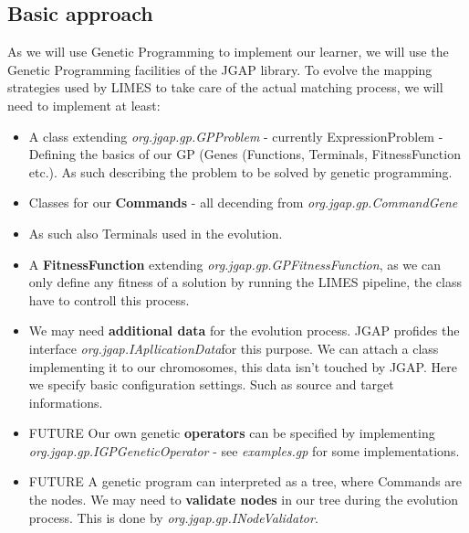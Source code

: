 \documentclass{article}%
\begin{document}
\subsection{Basic approach}
As we will use Genetic Programming to implement our learner, we will use the Genetic Programming facilities of the JGAP library. To evolve the mapping strategies used by LIMES to take care of the actual matching process, we will need to implement at least:
\begin{itemize}
	\item A class extending \textit{org.jgap.gp.GPProblem} - currently ExpressionProblem - Defining the basics of our GP (Genes (Functions, Terminals, FitnessFunction etc.). As such describing the problem to be solved by genetic programming.
	\item Classes for our \textbf{Commands} - all decending from \textit{org.jgap.gp.CommandGene} %
	\item As such also Terminals used in the evolution.
	\item A \textbf{FitnessFunction} extending \textit{org.jgap.gp.GPFitnessFunction}, as we can only define any fitness of a solution by running the LIMES pipeline, the class have to controll this process. %
	\item We may need \textbf{additional data} for the evolution process. JGAP profides the interface \textit{org.jgap.IApllicationData}for this purpose. We can attach a class implementing it to our chromosomes, this data isn't touched by JGAP. Here we specify basic configuration settings. Such as source and target informations.
	\item FUTURE Our own genetic \textbf{operators} can be specified by implementing \textit{org.jgap.gp.IGPGeneticOperator} - see \textit{examples.gp} for some implementations.
	\item FUTURE A genetic program can interpreted as a tree, where Commands are the nodes. We may need to \textbf{validate nodes} in our tree during the evolution process. This is done by \textit{org.jgap.gp.INodeValidator}.
\end{itemize}
\end{document}
